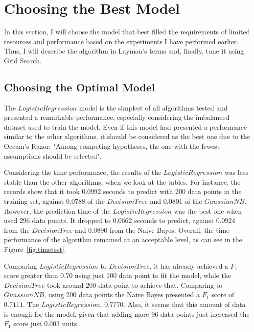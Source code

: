 \documentclass[a4paper]{article}
\begin{document}

\section{Choosing the Best Model}
In this section, I will choose the model that best filled the requirements of limited resources and performance based on the experiments I have performed earlier. Thus, I will describe the algorithm in Layman's terms and, finally, tune it using Grid Search.

\subsection{Choosing the Optimal Model}
The $Logistic Regression$ model is the simplest of all algorithms tested and presented a remarkable performance, especially considering the imbalanced dataset used to train the model. Even if this model had presented a performance similar to the other algorithms, it should be considered as the best one due to the Occam's Razor: "Among competing hypotheses, the one with the fewest assumptions should be selected".

Considering the time performance, the results of the $Logistic Regression$ was less stable than the other algorithms, when we look at the tables. For instance, the records show that it took $0.0992$ seconds to predict with 200 data points in the training set, against $0.0788$ of the $Decision Tree$ and $0.0801$ of the $GaussianNB$. However, the prediction time of the $Logistic Regression$ was the best one when used 296 data points. It dropped to $0.0662$ seconds to predict, against $0.0924$ from the $Decision Tree$ and $0.0890$ from the Naive Bayes. Overall, the time performance of the algorithm remained at an acceptable level, as can see in the Figure~\ref{fig:timetest}.

Comparing $Logistic Regression$ to $Decision Tree$, it has already achieved a $F_1$ score greater than $0.70$ using just 100 data point to fit the model, while the $Decision Tree$ took around 200 data point to achieve that. Comparing to $GuassianNB$, using 200 data points the Naive Bayes presented a $F_1$ score of $0.7111$. The $Logistic Regression$, $0.7770$. Also, it seems that this amount of data is enough for the model, given that adding more 96 data points just increased the $F_1$ score just $0.003$ units. 
\end{document}
